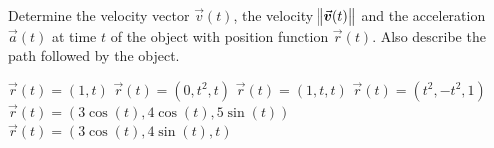 \begin{Exercise} Determine the velocity vector $\vec v(t)$, the velocity $\norm{\vec v(t)}$ and the acceleration $\vec a(t)$ at time $t$ of the object with position function $\vec r(t) $. Also describe the path followed by the object. 
    \begin{multicols}{2}
        \Question[difficulty = 1] $\vec r(t) = \left(1, t \right)$
        \Question[difficulty = 1] $\vec r(t) = \left(0, t^2, t \right)$
        \Question[difficulty = 2] $\vec r(t) = \left(1, t, t \right)$
        \Question[difficulty = 2] $\vec r(t) = \left(t^2, -t^2, 1 \right)$
        \Question[difficulty = 3] $\vec r(t) = \left(3 \cos (t), 4 \cos (t), 5\sin (t)\right)$
        \Question[difficulty = 3] $\vec r(t) = \left(3 \cos (t), 4 \sin (t), t\right)$
        \EndCurrentQuestion
    \end{multicols}
\end{Exercise}


